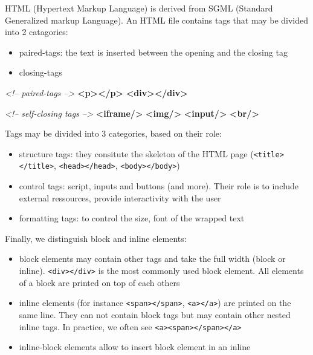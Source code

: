 \documentclass[]{book}
\newenvironment{Shaded}{\begin{snugshade}}{\end{snugshade}}
\newcommand{\CommentTok}[1]{\textcolor[rgb]{0.56,0.35,0.01}{\textit{#1}}}
\newcommand{\KeywordTok}[1]{\textcolor[rgb]{0.13,0.29,0.53}{\textbf{#1}}}
\providecommand{\tightlist}{%
  \setlength{\itemsep}{0pt}\setlength{\parskip}{0pt}}
\begin{document}
HTML (Hypertext Markup Language) is derived from SGML (Standard Generalized markup Language). An HTML file contains tags that may be divided into 2 catagories:

\begin{itemize}
\tightlist
\item
  paired-tags: the text is inserted between the opening and the closing tag
\item
  closing-tags
\end{itemize}

\begin{Shaded}
\begin{Highlighting}[]
\CommentTok{<!-- paired-tags -->}
\KeywordTok{<p></p>}
\KeywordTok{<div></div>}

\CommentTok{<!-- self-closing tags -->}
\KeywordTok{<iframe/>}
\KeywordTok{<img/>}
\KeywordTok{<input/>}
\KeywordTok{<br/>}
\end{Highlighting}
\end{Shaded}

Tags may be divided into 3 categories, based on their role:

\begin{itemize}
\tightlist
\item
  structure tags: they consitute the skeleton of the HTML page (\texttt{\textless{}title\textgreater{}\textless{}/title\textgreater{}}, \texttt{\textless{}head\textgreater{}\textless{}/head\textgreater{}}, \texttt{\textless{}body\textgreater{}\textless{}/body\textgreater{}})
\item
  control tags: script, inputs and buttons (and more). Their role is to include external ressources, provide interactivity with the user
\item
  formatting tags: to control the size, font of the wrapped text
\end{itemize}

Finally, we distinguish block and inline elements:

\begin{itemize}
\tightlist
\item
  block elements may contain other tags and take the full width (block or inline). \texttt{\textless{}div\textgreater{}\textless{}/div\textgreater{}} is the most commonly used block element. All elements of a block are printed on top of each others
\item
  inline elements (for instance \texttt{\textless{}span\textgreater{}\textless{}/span\textgreater{}}, \texttt{\textless{}a\textgreater{}\textless{}/a\textgreater{}}) are printed on the same line. They can not contain block tags but may contain other nested inline tags. In practice, we often see \texttt{\textless{}a\textgreater{}\textless{}span\textgreater{}\textless{}/span\textgreater{}\textless{}/a\textgreater{}}
\item
  inline-block elements allow to insert block element in an inline
\end{itemize}
\end{document}
